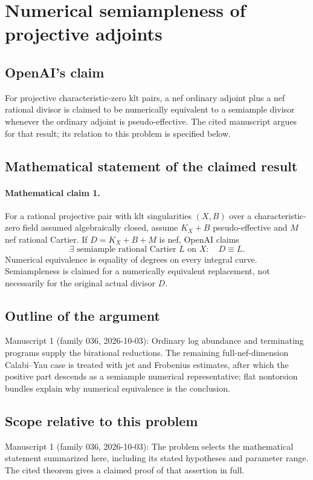 \documentclass[11pt]{article}
\begin{document}
\section*{Numerical semiampleness of projective adjoints}

\subsection{OpenAI's claim}
For projective characteristic-zero klt pairs, a nef ordinary adjoint plus a nef rational divisor is claimed to be numerically equivalent to a semiample divisor whenever the ordinary adjoint is pseudo-effective. The cited manuscript argues for that result; its relation to this problem is specified below.

\subsection{Mathematical statement of the claimed result}
\paragraph{Mathematical claim 1.} For a rational projective pair with klt singularities $(X,B)$ over a characteristic-zero field assumed algebraically closed, assume $K_X+B$ pseudo-effective and $M$ nef rational Cartier. If $D=K_X+B+M$ is nef, OpenAI claims
\[
\exists\text{ semiample rational Cartier }L\text{ on }X:\quad D\equiv L.
\]
Numerical equivalence is equality of degrees on every integral curve. Semiampleness is claimed for a numerically equivalent replacement, not necessarily for the original actual divisor $D$.

\subsection{Outline of the argument}
Manuscript 1 (family 036, 2026-10-03): Ordinary log abundance and terminating programs supply the birational reductions. The remaining full-nef-dimension Calabi--Yau case is treated with jet and Frobenius estimates, after which the positive part descends as a semiample numerical representative; flat nontorsion bundles explain why numerical equivalence is the conclusion.

\subsection{Scope relative to this problem}
Manuscript 1 (family 036, 2026-10-03): The problem selects the mathematical statement summarized here, including its stated hypotheses and parameter range. The cited theorem gives a claimed proof of that assertion in full.
\end{document}
